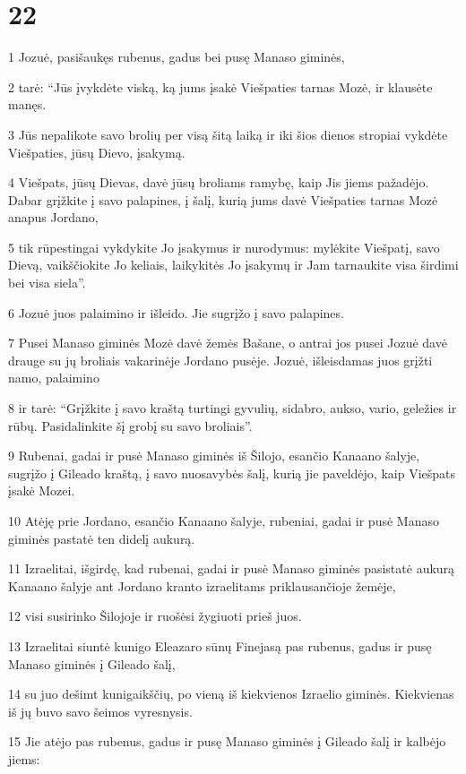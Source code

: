 \chapter{22}

\par 1 Jozuė, pasišaukęs rubenus, gadus bei pusę Manaso giminės, 
\par 2 tarė: “Jūs įvykdėte viską, ką jums įsakė Viešpaties tarnas Mozė, ir klausėte manęs. 
\par 3 Jūs nepalikote savo brolių per visą šitą laiką ir iki šios dienos stropiai vykdėte Viešpaties, jūsų Dievo, įsakymą. 
\par 4 Viešpats, jūsų Dievas, davė jūsų broliams ramybę, kaip Jis jiems pažadėjo. Dabar grįžkite į savo palapines, į šalį, kurią jums davė Viešpaties tarnas Mozė anapus Jordano, 
\par 5 tik rūpestingai vykdykite Jo įsakymus ir nurodymus: mylėkite Viešpatį, savo Dievą, vaikščiokite Jo keliais, laikykitės Jo įsakymų ir Jam tarnaukite visa širdimi bei visa siela”. 
\par 6 Jozuė juos palaimino ir išleido. Jie sugrįžo į savo palapines. 
\par 7 Pusei Manaso giminės Mozė davė žemės Bašane, o antrai jos pusei Jozuė davė drauge su jų broliais vakarinėje Jordano pusėje. Jozuė, išleisdamas juos grįžti namo, palaimino 
\par 8 ir tarė: “Grįžkite į savo kraštą turtingi gyvulių, sidabro, aukso, vario, geležies ir rūbų. Pasidalinkite šį grobį su savo broliais”. 
\par 9 Rubenai, gadai ir pusė Manaso giminės iš Šilojo, esančio Kanaano šalyje, sugrįžo į Gileado kraštą, į savo nuosavybės šalį, kurią jie paveldėjo, kaip Viešpats įsakė Mozei. 
\par 10 Atėję prie Jordano, esančio Kanaano šalyje, rubeniai, gadai ir pusė Manaso giminės pastatė ten didelį aukurą. 
\par 11 Izraelitai, išgirdę, kad rubenai, gadai ir pusė Manaso giminės pasistatė aukurą Kanaano šalyje ant Jordano kranto izraelitams priklausančioje žemėje, 
\par 12 visi susirinko Šilojoje ir ruošėsi žygiuoti prieš juos. 
\par 13 Izraelitai siuntė kunigo Eleazaro sūnų Finejasą pas rubenus, gadus ir pusę Manaso giminės į Gileado šalį, 
\par 14 su juo dešimt kunigaikščių, po vieną iš kiekvienos Izraelio giminės. Kiekvienas iš jų buvo savo šeimos vyresnysis. 
\par 15 Jie atėjo pas rubenus, gadus ir pusę Manaso giminės į Gileado šalį ir kalbėjo jiems: 
